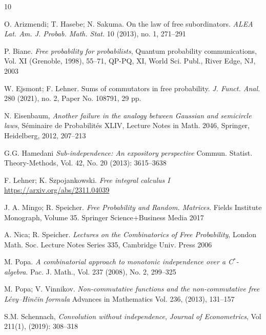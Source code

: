 \documentclass{amsart}
\begin{document}
\begin{thebibliography}{10}
	
	 O. Arizmendi; T. Hasebe; N. Sakuma. On the law of free subordinators. \emph{ALEA Lat. Am. J. Probab. Math. Stat.} 10 (2013), no. 1, 271--291
	
	P. Biane. \emph{Free probability for probabilists},
	Quantum probability communications, Vol. XI (Grenoble, 1998), 55--71, QP-PQ, XI, World Sci. Publ., River Edge, NJ, 2003


 W. Ejsmont; F. Lehner. Sums of commutators in free probability. \emph{J. Funct. Anal.} 280 (2021), no. 2, Paper No. 108791, 29 pp.

 N. Eisenbaum, \emph{Another failure in the analogy between Gaussian and semicircle laws}, Séminaire de Probabilités XLIV, Lecture Notes in Math. 2046, Springer, Heidelberg, 2012, 207--213

G.G. Hamedani
\emph{Sub-independence: An expository perspective}
Commun. Statist. Theory-Methods, Vol. 42, No. 20 (2013): 3615--3638

	 F. Lehner; K. Szpojankowski. 
	\emph{Free integral calculus I} \url{https://arxiv.org/abs/2311.04039}
	
	
	J. A. Mingo; R. Speicher. \emph{Free Probability and Random. Matrices}. Fields Institute Monograph, Volume 35. Springer Science+Business Media 2017
	
	 A. Nica; R. Speicher.
	\emph{Lectures on the Combinatorics of Free Probability}, London Math. Soc. Lecture Notes Series 335, Cambridge Univ. Press 2006
	
	 M. Popa.
	 \emph{A combinatorial approach to monotonic independence over a C$^\ast$-algebra}. Pac. J. Math.,  Vol. 237 (2008), No. 2, 299--325
	 
	 M. Popa; V. Vinnikov.
	 \emph{Non-commutative functions and the non-commutative free Lévy–Hinčin formula} 
	 Advances in Mathematics
	 Vol. 236, (2013), 131--157
	 
	 S.M. Schennach, 
	\emph{Convolution without independence},
	\emph{Journal of Econometrics}, Vol 211(1), (2019): 308--318
	





\end{thebibliography}



\end{document}
